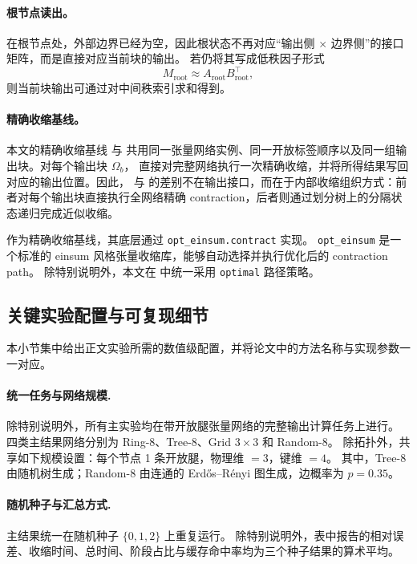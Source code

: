 \paragraph{根节点读出。}
在根节点处，外部边界已经为空，因此根状态不再对应“输出侧 $\times$ 边界侧”的接口矩阵，而是直接对应当前块的输出。
若仍将其写成低秩因子形式
\[
M_{\mathrm{root}} \approx A_{\mathrm{root}} B_{\mathrm{root}}^\top,
\]
则当前块输出可通过对中间秩索引求和得到。

\paragraph{精确收缩基线。}
本文的精确收缩基线 \exact{} 与 \ours{} 共用同一张量网络实例、同一开放标签顺序以及同一组输出块。对每个输出块 $\Omega_b$，\exact{} 直接对完整网络执行一次精确收缩，并将所得结果写回对应的输出位置。因此，\exact{} 与 \ours{} 的差别不在输出接口，而在于内部收缩组织方式：前者对每个输出块直接执行全网络精确 contraction，后者则通过划分树上的分隔状态递归完成近似收缩。

\exact{} 作为精确收缩基线，其底层通过 \texttt{opt\_einsum.contract} 实现。%
\texttt{opt\_einsum} 是一个标准的 einsum 风格张量收缩库，能够自动选择并执行优化后的 contraction path。%
除特别说明外，本文在 \exact{} 中统一采用 \texttt{optimal} 路径策略。

\subsection{关键实验配置与可复现细节}
\label{app:exp-details}

本小节集中给出正文实验所需的数值级配置，并将论文中的方法名称与实现参数一一对应。

\paragraph{统一任务与网络规模.}
除特别说明外，所有主实验均在带开放腿张量网络的完整输出计算任务上进行。
四类主结果网络分别为 Ring-8、Tree-8、Grid $3\times 3$ 和 Random-8。
除拓扑外，共享如下规模设置：每个节点 1 条开放腿，物理维 $=3$，键维 $=4$。
其中，Tree-8 由随机树生成；Random-8 由连通的 Erd\H{o}s--Rényi 图生成，边概率为 $p=0.35$。

\paragraph{随机种子与汇总方式.}
主结果统一在随机种子 $\{0,1,2\}$ 上重复运行。
除特别说明外，表中报告的相对误差、收缩时间、总时间、阶段占比与缓存命中率均为三个种子结果的算术平均。

